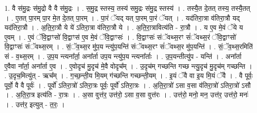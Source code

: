 \documentclass[17pt]{extarticle}
\begin{document}
1. वै स॑मु॒द्रः स॑मु॒द्रो वै वै स॑मु॒द्रः । . स॒मु॒द्र स्तस्य॒ तस्य॑ समु॒द्रः स॑मु॒द्र स्तस्य॑ । . तस्यै॒त दे॒तत् तस्य॒ तस्यै॒तत् । . ए॒तत् पा॒रम् पा॒र मे॒त दे॒तत् पा॒रम् । . पा॒रं ॅयद् यत् पा॒रम् पा॒रं ॅयत् । . यद॑तिरा॒त्रा व॑तिरा॒त्रौ यद् यद॑तिरा॒त्रौ । . अ॒ति॒रा॒त्रौ ये ये॑ ऽतिरा॒त्रा व॑तिरा॒त्रौ ये । . अ॒ति॒रा॒त्रावित्य॑ति - रा॒त्रौ । . य ए॒व मे॒वं ॅये य ए॒वम् । . ए॒वं ॅवि॒द्वाꣳसो॑ वि॒द्वाꣳस॑ ए॒व मे॒वं ॅवि॒द्वाꣳसः॑ । . वि॒द्वाꣳसः॑ संॅवथ्स॒रꣳ सं॑ॅवथ्स॒रं ॅवि॒द्वाꣳसो॑ वि॒द्वाꣳसः॑ संॅवथ्स॒रम् । . सं॒ॅव॒थ्स॒र मु॑प॒य न्त्यु॑प॒यन्ति॑ संॅवथ्स॒रꣳ सं॑ॅवथ्स॒र मु॑प॒यन्ति॑ । . सं॒ॅव॒थ्स॒रमिति॑ सं - व॒थ्स॒रम् । . उ॒प॒य न्त्यना᳚र्ता॒ अना᳚र्ता उप॒य न्त्यु॑प॒य न्त्यना᳚र्ताः । . उ॒प॒यन्तीत्यु॑प - यन्ति॑ । . अना᳚र्ता ए॒वैवा ना᳚र्ता॒ अना᳚र्ता ए॒व । . ए॒वोदृच॑ मु॒दृच॑ मे॒वै वोदृच᳚म् । . उ॒दृच॑म् गच्छन्ति गच्छ न्त्यु॒दृच॑ मु॒दृच॑म् गच्छन्ति । . उ॒दृच॒मित्यु॑त् - ऋच᳚म् । . ग॒च्छ॒न्ती॒य मि॒यम् ग॑च्छन्ति गच्छन्ती॒यम् । . इ॒यं ॅवै वा इ॒य मि॒यं ॅवै । . वै पूर्वः॒ पूर्वो॒ वै वै पूर्वः॑ । . पूर्वो॑ ऽतिरा॒त्रो॑ ऽतिरा॒त्रः पूर्वः॒ पूर्वो॑ ऽतिरा॒त्रः । . अ॒ति॒रा॒त्रो॑ ऽसा व॒सा व॑तिरा॒त्रो॑ ऽतिरा॒त्रो॑ ऽसौ । . अ॒ति॒रा॒त्र इत्य॑ति - रा॒त्रः । . अ॒सा वुत्त॑र॒ उत्त॑रो॒ ऽसा व॒सा वुत्त॑रः । . उत्त॑रो॒ मनो॒ मन॒ उत्त॑र॒ उत्त॑रो॒ मनः॑ । . उत्त॑र॒ इत्युत् - त॒रः॒ । \newline
\end{document}
